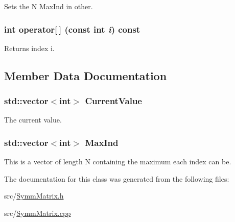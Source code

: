 Sets the N MaxInd in other. \hypertarget{classJKBuilder_1_1Iterator_a74247cf730a06b23fcb1ec64e5596b25}{
\subsubsection[{operator[]}]{\setlength{\rightskip}{0pt plus 5cm}int operator\mbox{[}$\,$\mbox{]} (const int {\em i}) const}}
\label{classJKBuilder_1_1Iterator_a74247cf730a06b23fcb1ec64e5596b25}


Returns index i. 

\subsection{Member Data Documentation}
\hypertarget{classJKBuilder_1_1Iterator_a20ca24f6d827aba144bb087c4bcb74a0}{
\subsubsection[{CurrentValue}]{\setlength{\rightskip}{0pt plus 5cm}std::vector$<$int$>$ {\bf CurrentValue}}}
\label{classJKBuilder_1_1Iterator_a20ca24f6d827aba144bb087c4bcb74a0}


The current value. \hypertarget{classJKBuilder_1_1Iterator_ab6b56d3c4e9353bc938dd6249cde9ca0}{
\subsubsection[{MaxInd}]{\setlength{\rightskip}{0pt plus 5cm}std::vector$<$int$>$ {\bf MaxInd}}}
\label{classJKBuilder_1_1Iterator_ab6b56d3c4e9353bc938dd6249cde9ca0}


This is a vector of length N containing the maximum each index can be. 

The documentation for this class was generated from the following files:\begin{DoxyCompactItemize}
\item 
src/\hyperlink{SymmMatrix_8h}{SymmMatrix.h}\item 
src/\hyperlink{SymmMatrix_8cpp}{SymmMatrix.cpp}\end{DoxyCompactItemize}

